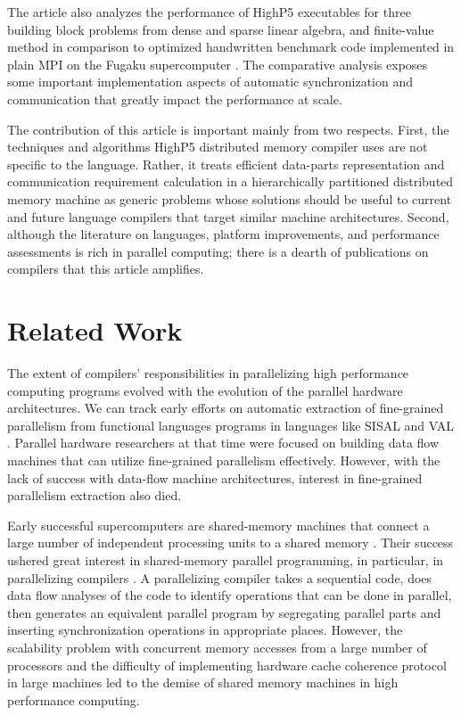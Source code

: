 \documentclass[ASNA,twocolumn]{USG} %
\begin{document}
{The article also analyzes the performance of HighP5 executables for three building block problems from dense and sparse linear algebra, and finite-value method in comparison to optimized handwritten benchmark code implemented in plain MPI on the Fugaku supercomputer \citep{sato2021co}. The comparative analysis exposes some important implementation aspects of automatic synchronization and communication that greatly impact the performance at scale.
	
The contribution of this article is important mainly from two respects. First, the techniques and algorithms HighP5 distributed memory compiler uses are not specific to the language. Rather, it treats efficient data-parts representation and communication requirement calculation in a hierarchically partitioned distributed memory machine as generic problems whose solutions should be useful to current and future language compilers that target similar machine architectures. Second, although the literature on languages, platform improvements, and performance assessments is rich in parallel computing; there is a dearth of publications on compilers that this article amplifies.  
	
\section{Related Work}
\label{sec:related-work}
The extent of compilers' responsibilities in parallelizing high performance computing programs evolved with the evolution of the parallel hardware architectures. We can track early efforts on automatic extraction of fine-grained parallelism from functional languages programs in languages like SISAL \citep{osti_10192282}\citep{FEO1990349} and VAL \citep{10.1145/357153.357157}. Parallel hardware researchers at that time were focused on building data flow machines \citep{GURD198549}\citep{10.1145/27633.28055} that can utilize fine-grained parallelism effectively. However, with the lack of success with data-flow machine architectures, interest in fine-grained parallelism extraction also died.
	
Early successful supercomputers are shared-memory machines that connect a large number of independent processing units to a shared memory \citep{10.5555/1623264.1623335} \citep{10.1145/1480083.1480098} \citep{hord1982illiac}. Their success ushered great interest in shared-memory parallel programming, in particular, in parallelizing compilers \citep{10.1145/234313.234417}\citep{10.1145/193209.193217}. A parallelizing compiler takes a sequential code, does data flow analyses of the code to identify operations that can be done in parallel, then generates an equivalent parallel program by segregating parallel parts and inserting synchronization operations in appropriate places. However, the scalability problem with concurrent memory accesses from a large number of processors and the difficulty of implementing hardware cache coherence protocol in large machines led to the demise of shared memory machines in high performance computing.
	
}
\end{document}
